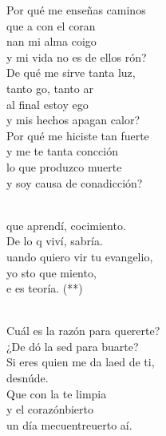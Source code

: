 \documentclass[12pt]{article}
\begin{document}
\begin{multicols*}{2}
\begin{cancion}%
	Por qué me enseñas caminos \\
	que a con el coran \\
	nan mi alma coigo\\
	y mi vida no es de ellos rón?\\
	De qué me sirve tanta luz, \\
	tanto go, tanto ar\\
	al final estoy ego \\
	y mis hechos apagan  calor?\\
	Por qué me hiciste tan fuerte \\
	y me te tanta concción\\
	lo que produzco  muerte \\
	y soy causa de conadicción?\\\jump\\
	\begin{chorus}%
	que aprendí, cocimiento. \\
	De lo q viví, sabría.\\
	uando quiero vir tu evangelio, \\
	yo sto que miento,\\
	e es teoría. (**)\\
	\end{chorus}%
	\jump\\
	Cuál es la razón para quererte?\\
	¿De dó la sed para buarte? \\
	Si eres  quien me da laed de ti, \\
	desnúde.\\
	Que con la te limpia \\
	y el corazónbierto\\
	un día mecuentreuerto aí.\\\jump\\
	\begin{chorus}%

\end{chorus}
\end{cancion}
\end{multicols*}
\end{document}
